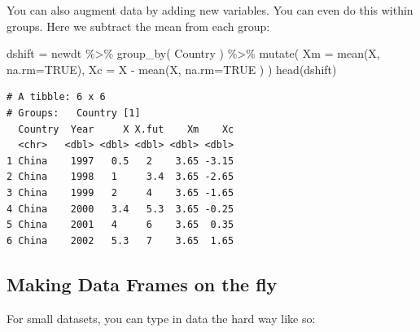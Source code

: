 \documentclass[
  letterpaper,
  DIV=11,
  numbers=noendperiod]{scrreprt}
\newenvironment{Shaded}{}{}
\newcommand{\AttributeTok}[1]{\textcolor[rgb]{0.49,0.56,0.16}{#1}}
\newcommand{\ConstantTok}[1]{\textcolor[rgb]{0.53,0.00,0.00}{#1}}
\newcommand{\FunctionTok}[1]{\textcolor[rgb]{0.02,0.16,0.49}{#1}}
\newcommand{\NormalTok}[1]{#1}
\newcommand{\OtherTok}[1]{\textcolor[rgb]{0.00,0.44,0.13}{#1}}
\newcommand{\SpecialCharTok}[1]{\textcolor[rgb]{0.25,0.44,0.63}{#1}}
\begin{document}
You can also augment data by adding new variables. You can even do this
within groups. Here we subtract the mean from each group:

\begin{Shaded}
\begin{Highlighting}[]
\NormalTok{dshift }\OtherTok{=}\NormalTok{ newdt }\SpecialCharTok{\%\textgreater{}\%} \FunctionTok{group\_by}\NormalTok{( Country ) }\SpecialCharTok{\%\textgreater{}\%}
    \FunctionTok{mutate}\NormalTok{( }\AttributeTok{Xm =} \FunctionTok{mean}\NormalTok{(X, }\AttributeTok{na.rm=}\ConstantTok{TRUE}\NormalTok{),}
            \AttributeTok{Xc =}\NormalTok{ X }\SpecialCharTok{{-}} \FunctionTok{mean}\NormalTok{(X, }\AttributeTok{na.rm=}\ConstantTok{TRUE}\NormalTok{ ) )}
\FunctionTok{head}\NormalTok{(dshift)}
\end{Highlighting}
\end{Shaded}

\begin{verbatim}
# A tibble: 6 x 6
# Groups:   Country [1]
  Country  Year     X X.fut    Xm    Xc
  <chr>   <dbl> <dbl> <dbl> <dbl> <dbl>
1 China    1997   0.5   2    3.65 -3.15
2 China    1998   1     3.4  3.65 -2.65
3 China    1999   2     4    3.65 -1.65
4 China    2000   3.4   5.3  3.65 -0.25
5 China    2001   4     6    3.65  0.35
6 China    2002   5.3   7    3.65  1.65
\end{verbatim}

\subsection{Making Data Frames on the
fly}\label{making-data-frames-on-the-fly}

For small datasets, you can type in data the hard way like so:
\end{document}
